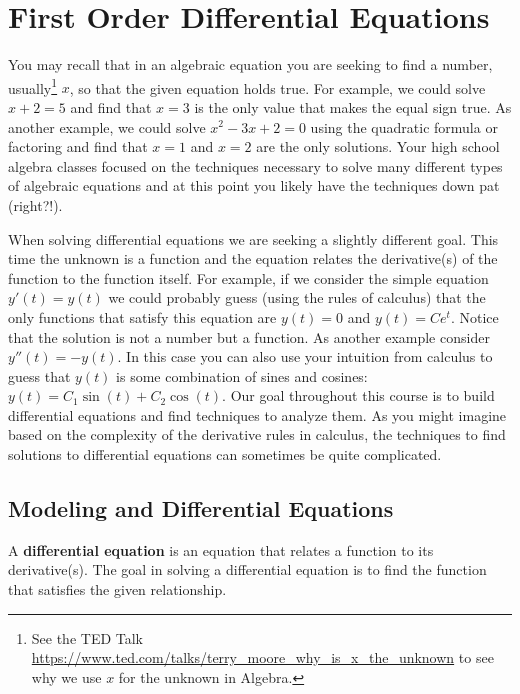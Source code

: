 \chapter{First Order Differential Equations}
You may recall that in an algebraic equation you are seeking to find a number,
usually\footnote{See the TED Talk
    \href{https://www.ted.com/talks/terry_moore_why_is_x_the_unknown}{https://www.ted.com/talks/terry\_moore\_why\_is\_x\_the\_unknown}
to see why we use $x$ for the unknown in Algebra.}
$x$, so that the given equation holds true.  For example, we could solve $x+2 = 5$ and
find that $x=3$ is the only value that makes the equal sign true.  As another example, we
could solve $x^2-3x+2 = 0$ using the quadratic formula or factoring and find that $x=1$
and $x=2$ are the only solutions. Your high school algebra classes focused on the
techniques necessary to solve many different types of algebraic equations and at this
point you likely have the techniques down pat (right?!).

When solving differential equations we are seeking a slightly different goal.  This time
the unknown is a function and the equation relates the derivative(s) of the function to
the function itself.  For example, if we consider the simple equation $y'(t) = y(t)$ we could
probably guess (using the rules of calculus) that the only functions that satisfy this
equation are $y(t) = 0$ and $y(t) = Ce^t$.  Notice that the solution is not a number but a
function.  As another example consider $y''(t) = -y(t)$.  In this case you can also use
your intuition from calculus to guess that $y(t)$ is some combination of sines and
cosines: $y(t) = C_1 \sin(t) + C_2 \cos(t)$. Our goal throughout this course is to build
differential equations and find techniques to analyze them. As you might imagine based on
the complexity of the derivative rules in calculus, the techniques to find solutions to
differential equations can sometimes be quite complicated.

\newpage \section{Modeling and Differential Equations}

\begin{definition}
    A {\bf differential equation} is an equation that relates a function to its
    derivative(s).  The goal in solving a differential equation is to find the function
    that satisfies the given relationship.
\end{definition}

